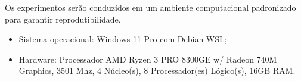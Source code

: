 Os experimentos serão conduzidos em um ambiente computacional padronizado para garantir reprodutibilidade. 

\begin{itemize}
    \item Sistema operacional: Windows 11 Pro com Debian WSL;
    \item Hardware: Processador	AMD Ryzen 3 PRO 8300GE w/ Radeon 740M Graphics, 3501 Mhz, 4 Núcleo(s), 8 Processador(es) Lógico(s), 16GB RAM.
\end{itemize}




